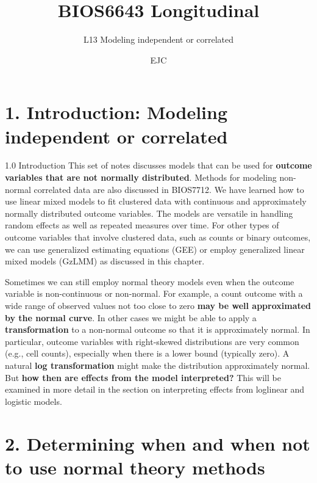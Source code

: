 \documentclass[
  9pt,
  ignorenonframetext,
]{beamer}
\title{BIOS6643 Longitudinal}
\subtitle{L13 Modeling independent or correlated}
\author{EJC}
\date{}
\institute{Department of Biostatistics \& Informatics}
\begin{document}
\frame{\titlepage}

\begin{frame}[allowframebreaks]
  \tableofcontents[hideallsubsections]
\end{frame}
\hypertarget{introduction-modeling-independent-or-correlated}{%
\section{1. Introduction: Modeling independent or
correlated}\label{introduction-modeling-independent-or-correlated}}

\begin{frame}{1.0 Introduction}
\protect\hypertarget{introduction}{}
This set of notes discusses models that can be used for \textbf{outcome
variables that are not normally distributed}. Methods for modeling
non-normal correlated data are also discussed in BIOS7712. We have
learned how to use linear mixed models to fit clustered data with
continuous and approximately normally distributed outcome variables. The
models are versatile in handling random effects as well as repeated
measures over time. For other types of outcome variables that involve
clustered data, such as counts or binary outcomes, we can use
generalized estimating equations (GEE) or employ generalized linear
mixed models (GzLMM) as discussed in this chapter.

Sometimes we can still employ normal theory models even when the outcome
variable is non-continuous or non-normal. For example, a count outcome
with a wide range of observed values not too close to zero \textbf{may
be well approximated by the normal curve}. In other cases we might be
able to apply a \textbf{transformation} to a non-normal outcome so that
it is approximately normal. In particular, outcome variables with
right-skewed distributions are very common (e.g., cell counts),
especially when there is a lower bound (typically zero). A natural
\textbf{log transformation} might make the distribution approximately
normal. But \textbf{how then are effects from the model interpreted?}
This will be examined in more detail in the section on interpreting
effects from loglinear and logistic models.
\end{frame}

\hypertarget{determining-when-and-when-not-to-use-normal-theory-methods}{%
\section{2. Determining when and when not to use normal theory
methods}\label{determining-when-and-when-not-to-use-normal-theory-methods}}
\end{document}
